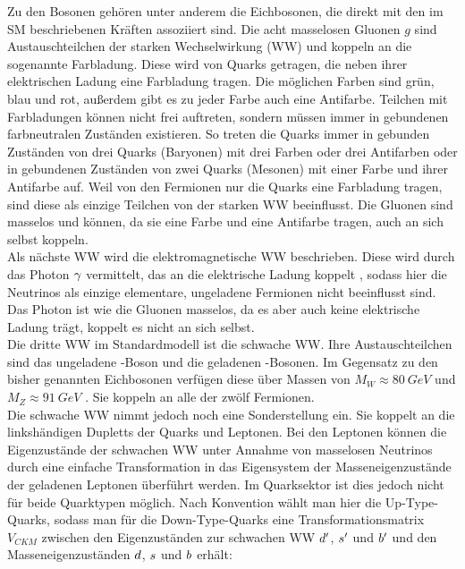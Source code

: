 Zu den Bosonen gehören unter anderem die Eichbosonen, die direkt mit den im SM beschriebenen Kräften assoziiert sind. Die acht masselosen Gluonen $g$ sind Austauschteilchen der starken Wechselwirkung (WW) und koppeln an die  sogenannte Farbladung. Diese wird von Quarks getragen, die neben ihrer elektrischen Ladung eine Farbladung tragen. Die möglichen Farben sind grün, blau und rot, außerdem gibt es zu jeder Farbe auch eine Antifarbe. Teilchen mit Farbladungen können nicht frei auftreten, sondern müssen immer in gebundenen farbneutralen Zuständen existieren. So treten die Quarks immer in gebunden Zuständen von drei Quarks (Baryonen) mit drei Farben oder drei Antifarben oder in gebundenen Zuständen von zwei Quarks (Mesonen) mit einer Farbe und ihrer Antifarbe auf. Weil von den Fermionen nur die Quarks eine Farbladung tragen, sind diese als einzige Teilchen von der starken WW beeinflusst. Die Gluonen sind masselos und können, da sie eine Farbe und eine Antifarbe tragen, auch an sich selbst koppeln.\\ 
Als nächste WW wird die elektromagnetische WW beschrieben. Diese wird durch das Photon ${\gamma}$ vermittelt, das an die elektrische Ladung koppelt , sodass hier die Neutrinos als einzige elementare, ungeladene Fermionen nicht beeinflusst sind. Das Photon ist wie die Gluonen masselos, da es aber auch keine elektrische Ladung trägt, koppelt es nicht an sich selbst.\\ 
Die dritte WW im Standardmodell ist die schwache WW. Ihre Austauschteilchen sind das ungeladene \Z-Boson und die geladenen \Wpm-Bosonen. Im Gegensatz zu den bisher genannten Eichbosonen verfügen diese über Massen von $M_W\approx\SI{80}{GeV}$ und $M_Z\approx\SI{91}{GeV}$ \cite{PDG-2012}. Sie koppeln an alle der zwölf Fermionen.\\ 
Die schwache WW nimmt jedoch noch eine Sonderstellung ein. Sie koppelt an die linkshändigen Dupletts der Quarks und Leptonen. Bei den Leptonen können die Eigenzustände der schwachen WW unter Annahme von masselosen Neutrinos durch eine einfache Transformation in das Eigensystem der Masseneigenzustände der geladenen Leptonen überführt werden. Im Quarksektor ist dies jedoch nicht für beide Quarktypen möglich. Nach Konvention wählt man hier die Up-Type-Quarks, sodass man für die Down-Type-Quarks eine Transformationsmatrix $V_{C\!K\!M}$ zwischen den Eigenzuständen zur schwachen WW ${d}'$, ${s}'$ und ${b}'$ und den Masseneigenzuständen ${d}$, ${s}$ und ${b}$ erhält:
